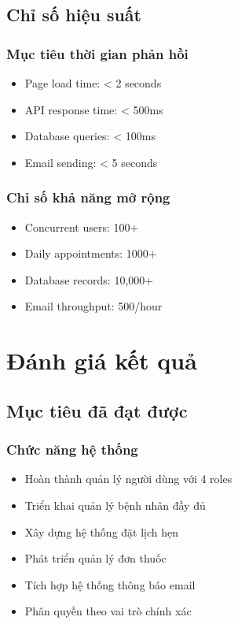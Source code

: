 \documentclass[12pt,a4paper]{report}
\begin{document}
\section{Chỉ số hiệu suất}

\subsection{Mục tiêu thời gian phản hồi}
\begin{itemize}
    \item Page load time: < 2 seconds
    \item API response time: < 500ms
    \item Database queries: < 100ms
    \item Email sending: < 5 seconds
\end{itemize}

\subsection{Chỉ số khả năng mở rộng}
\begin{itemize}
    \item Concurrent users: 100+
    \item Daily appointments: 1000+
    \item Database records: 10,000+
    \item Email throughput: 500/hour
\end{itemize}

\chapter{Đánh giá kết quả}

\section{Mục tiêu đã đạt được}

\subsection{Chức năng hệ thống}
\begin{itemize}
    \item Hoàn thành quản lý người dùng với 4 roles
    \item Triển khai quản lý bệnh nhân đầy đủ
    \item Xây dựng hệ thống đặt lịch hẹn
    \item Phát triển quản lý đơn thuốc
    \item Tích hợp hệ thống thông báo email
    \item Phân quyền theo vai trò chính xác
\end{itemize}
\end{document}
